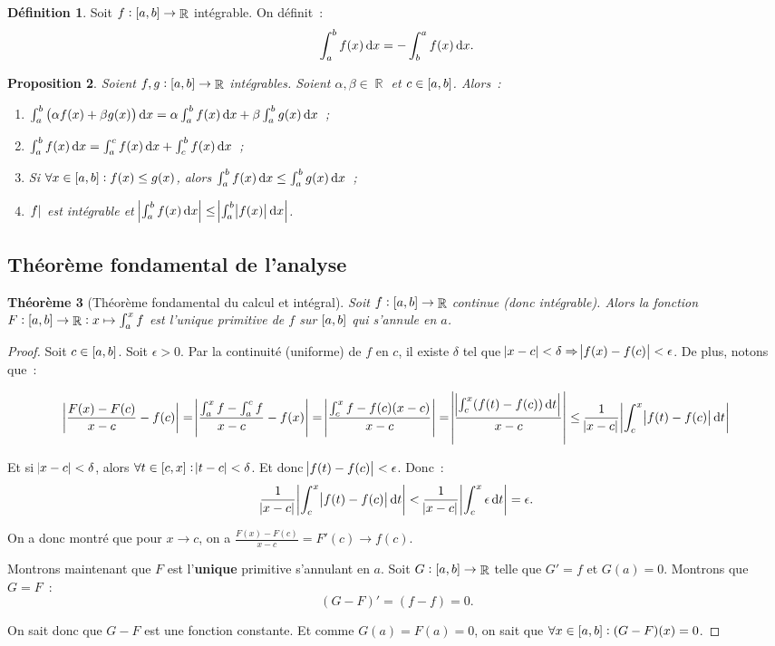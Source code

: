 \documentclass{article}
\DeclareMathOperator{\R}{\mathbb R}
\newcommand{\ab}{\interval ab}
\newcommand{\fabr}[1]{#1 : \ab \to \R}
\newtheorem{thm}{Théorème}[section]
\newtheorem{prp}[thm]{Proposition}
\theoremstyle{definition}
\newtheorem{déf}[thm]{Définition}
\theoremstyle{remark}
\begin{document}
		\begin{déf} Soit $\fabr f$ intégrable. On définit~:
		\[\int_a^bf(x)\dif x = -\int_b^af(x)\dif x.\]
		\end{déf}

		\begin{prp} Soient $\fabr {f, g}$ intégrables. Soient $\alpha, \beta \in \R$ et $c \in \ab$. Alors~:

		\begin{enumerate}
			\item $\int_a^b\left(\alpha f(x) + \beta g(x)\right)\dif x = \alpha \int_a^bf(x)\dif x + \beta\int_a^bg(x)\dif x$~;
			\item $\int_a^bf(x)\dif x = \int_a^cf(x)\dif x + \int_c^bf(x)\dif x$~;
			\item Si $\forall x \in \ab : f(x) \leq g(x)$, alors $\int_a^bf(x)\dif x \leq \int_a^bg(x)\dif x$~;
			\item $\abs f$ est intégrable et $\abs{\int_a^bf(x)\dif x} \leq \abs{\int_a^b\abs{f(x)}\dif x}$.
		\end{enumerate}
		\end{prp}

	\subsection{Théorème fondamental de l'analyse}

		\begin{thm}[Théorème fondamental du calcul et intégral] Soit $\fabr f$ continue (donc intégrable). Alors la fonction $\fabr F : x \mapsto \int_a^xf$
		est l'unique primitive de $f$ sur $\ab$ qui s'annule en $a$. \end{thm}

		\begin{proof} Soit $c \in \ab$. Soit $\epsilon > 0$. Par la continuité (uniforme) de $f$ en $c$, il existe $\delta$ tel que
		$\abs{x-c}<\delta \Rightarrow \abs{f(x)-f(c)} < \epsilon$. De plus, notons que~:

		\begin{align*}
			\abs{\frac {F(x)-F(c)}{x-c}-f(c)} = \abs{\frac {\int_a^xf - \int_a^cf}{x-c}-f(x)} = \abs{\frac {\int_c^xf - f(c)(x-c)}{x-c}}
			= \abs{\frac {\abs{\int_c^x(f(t)-f(c))\dif t}}{x-c}} \leq \frac 1{\abs{x-c}}\abs{\int_c^x\abs{f(t)-f(c)}\dif t}
		\end{align*}

		Et si $\abs{x-c} < \delta$, alors $\forall t \in \interval cx : \abs{t-c} < \delta $. Et donc $\abs{f(t)-f(c)} < \epsilon$. Donc~:
		\[\frac 1{\abs{x-c}}\abs{\int_c^x\abs{f(t)-f(c)}\dif t} < \frac 1{\abs{x-c}}\abs{\int_c^x\epsilon\dif t} = \epsilon.\]

		On a donc montré que pour $x \to c$, on a $\frac {F(x)-F(c)}{x-c} = F'(c) \to f(c)$.

		Montrons maintenant que $F$ est l'\textbf{unique} primitive s'annulant en $a$. Soit $\fabr G$ telle que $G' = f$ et $G(a) = 0$. Montrons que $G = F$~:
		\[(G-F)'=(f-f) = 0.\]

		On sait donc que $G-F$ est une fonction constante. Et comme $G(a) = F(a) = 0$, on sait que $\forall x \in \ab : (G-F)(x) = 0$. \end{proof}
\end{document}
